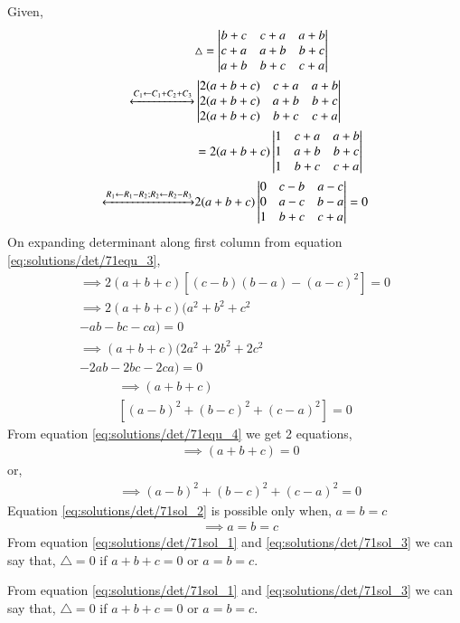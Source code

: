 Given,
\begin{align}
&\triangle = \begin{vmatrix}b+c & c+a & a+b\\c+a & a+b & b+c\\a+b&b+c & c+a\end{vmatrix} \label{eq:solutions/det/71ques}\\
\xleftrightarrow[]{C_1\leftarrow C_1+C_2+C_3}
&\begin{vmatrix}2(a+b+c) & c+a & a+b\\2(a+b+c) & a+b & b+c\\2(a+b+c)&b+c & c+a\end{vmatrix} \label{eq:solutions/det/71eq_1}\\
&=2(a+b+c)\begin{vmatrix}1 & c+a & a+b\\1 & a+b & b+c\\1&b+c & c+a\end{vmatrix} \label{eq:solutions/det/71eq_2}\\
\xleftrightarrow[]{R_1\leftarrow R_1-R_2; R_2 \leftarrow R_2-R_3}
&2(a+b+c)\begin{vmatrix}0 & c-b & a-c\\0 & a-c & b-a\\1&b+c & c+a\end{vmatrix} =0 \label{eq:solutions/det/71equ_3}
\end{align}
On expanding determinant along first column from equation \eqref{eq:solutions/det/71equ_3},
\begin{multline*}
\implies 2(a+b+c)[(c-b)(b-a)-(a-c)^{2}]=0
\\
\implies 2(a+b+c)(a^{2}+b^{2}+c^{2}\\
-ab-bc-ca)=0
\\
\implies (a+b+c)(2a^{2}+2b^{2}+2c^{2}\\
-2ab-2bc-2ca)=0
\end{multline*}
\begin{multline}
\implies (a+b+c)\\
[(a-b)^{2}+(b-c)^{2}+(c-a)^{2}] = 0 \label{eq:solutions/det/71equ_4}
\end{multline}
From equation \eqref{eq:solutions/det/71equ_4} we get 2 equations,
\begin{align}
&\implies \boxed{(a+b+c) = 0} \label{eq:solutions/det/71sol_1}
\end{align}
or,
\begin{align}
&\implies (a-b)^{2}+(b-c)^{2}+(c-a)^{2} = 0 \label{eq:solutions/det/71sol_2}
\end{align}
Equation \eqref{eq:solutions/det/71sol_2} is possible only when, $a=b=c$
\begin{align}
&\implies \boxed{a=b=c} \label{eq:solutions/det/71sol_3}
\end{align}
From equation \eqref{eq:solutions/det/71sol_1} and \eqref{eq:solutions/det/71sol_3} we can say that,
$\triangle=0$ if $a+b+c=0$ or $a=b=c$.

From equation \eqref{eq:solutions/det/71sol_1} and \eqref{eq:solutions/det/71sol_3} we can say that,
$\triangle=0$ if $a+b+c=0$ or $a=b=c$.

